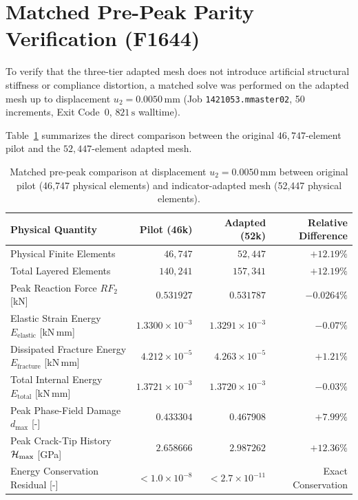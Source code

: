 \section{Matched Pre-Peak Parity Verification (F1644)}
\label{sec:hole_matched_parity}

To verify that the three-tier adapted mesh does not introduce artificial structural stiffness or compliance distortion, a matched solve was performed on the adapted mesh up to displacement $u_2 = 0.0050\,\mathrm{mm}$ (Job \texttt{1421053.mmaster02}, 50 increments, Exit Code~0, $821\,\mathrm{s}$ walltime).

Table~\ref{tab:matched_comparison} summarizes the direct comparison between the original $46{,}747$-element pilot and the $52{,}447$-element adapted mesh.

\begin{table}[htbp]
\centering
\caption{Matched pre-peak comparison at displacement $u_2 = 0.0050\,\mathrm{mm}$ between original pilot (46,747 physical elements) and indicator-adapted mesh (52,447 physical elements).}
\label{tab:matched_comparison}
\begin{tabular}{lrrr}
\hline
\textbf{Physical Quantity} & \textbf{Pilot (46k)} & \textbf{Adapted (52k)} & \textbf{Relative Difference} \\
\hline
Physical Finite Elements & $46{,}747$ & $52{,}447$ & $+12.19\%$ \\
Total Layered Elements & $140{,}241$ & $157{,}341$ & $+12.19\%$ \\
Peak Reaction Force $RF_2$ [kN] & $0.531927$ & $0.531787$ & $-0.0264\%$ \\
Elastic Strain Energy $E_{\mathrm{elastic}}$ [kN\,mm] & $1.3300 \times 10^{-3}$ & $1.3291 \times 10^{-3}$ & $-0.07\%$ \\
Dissipated Fracture Energy $E_{\mathrm{fracture}}$ [kN\,mm] & $4.212 \times 10^{-5}$ & $4.263 \times 10^{-5}$ & $+1.21\%$ \\
Total Internal Energy $E_{\mathrm{total}}$ [kN\,mm] & $1.3721 \times 10^{-3}$ & $1.3720 \times 10^{-3}$ & $-0.03\%$ \\
Peak Phase-Field Damage $d_{\max}$ [-] & $0.433304$ & $0.467908$ & $+7.99\%$ \\
Peak Crack-Tip History $\mathcal{H}_{\max}$ [GPa] & $2.658666$ & $2.987262$ & $+12.36\%$ \\
Energy Conservation Residual [-] & $< 1.0 \times 10^{-8}$ & $< 2.7 \times 10^{-11}$ & Exact Conservation \\
\hline
\end{tabular}
\end{table}

